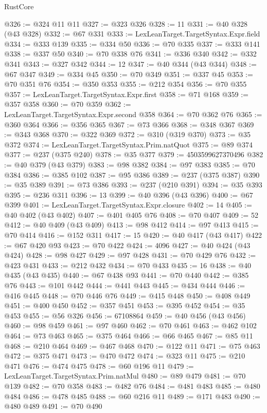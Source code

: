 \begin{lexlean}{RustCore}
\begin{coremodule}
@326 := @324 @11 @11
@327 := @323 @326
@328 := 11
@331 := @40 @328 (@43 @328)
@332 := @67 @331
@333 := LexLeanTarget.TargetSyntax.Expr.field
@334 := @333 @139
@335 := @334 @50
@336 := @70 @335
@337 := @333 @141
@338 := @337 @50
@340 := @70 @338 @76
@341 := @336 @340
@342 := @332 @341
@343 := @327 @342
@344 := 12
@347 := @40 @344 (@43 @344)
@348 := @67 @347
@349 := @334 @45
@350 := @70 @349
@351 := @337 @45
@353 := @70 @351 @76
@354 := @350 @353
@355 := @212 @354
@356 := @70 @355
@357 := LexLeanTarget.TargetSyntax.Expr.first
@358 := @71 @168
@359 := @357 @358
@360 := @70 @359
@362 := LexLeanTarget.TargetSyntax.Expr.second @358
@364 := @70 @362 @76
@365 := @360 @364
@366 := @356 @365
@367 := @73 @366
@368 := @348 @367
@369 := @343 @368
@370 := @322 @369
@372 := @310 (@319 @370)
@373 := @35 @372
@374 := LexLeanTarget.TargetSyntax.Prim.natQuot
@375 := @89 @374
@377 := @237 (@375 @240)
@378 := @35 @377
@379 := 4503599627370496
@382 := @40 @379 (@43 @379)
@383 := @98 @382
@384 := @97 @383
@385 := @70 @384
@386 := @385 @102
@387 := @95 @386
@389 := @237 (@375 @387)
@390 := @35 @389
@391 := @73 @386
@393 := @237 (@210 @391)
@394 := @35 @393
@395 := @236 @311
@396 := 13
@399 := @40 @396 (@43 @396)
@400 := @67 @399
@401 := LexLeanTarget.TargetSyntax.Expr.closure
@402 := 14
@405 := @40 @402 (@43 @402)
@407 := @401 @405 @76
@408 := @70 @407
@409 := 52
@412 := @40 @409 (@43 @409)
@413 := @98 @412
@414 := @97 @413
@415 := @70 @414
@416 := @152 @311
@417 := 15
@420 := @40 @417 (@43 @417)
@422 := @67 @420 @93
@423 := @70 @422
@424 := 4096
@427 := @40 @424 (@43 @424)
@428 := @98 @427
@429 := @97 @428
@431 := @70 @429 @76
@432 := @423 @431
@433 := @212 @432
@434 := @70 @433
@435 := 16
@438 := @40 @435 (@43 @435)
@440 := @67 @438 @93
@441 := @70 @440
@442 := @385 @76
@443 := @101 @442
@444 := @441 @443
@445 := @434 @444
@446 := @416 @445
@448 := @70 @446 @76
@449 := @415 @448
@450 := @408 @449
@451 := @400 @450
@452 := @357 @451
@453 := @395 @452
@454 := @35 @453
@455 := @56 @326
@456 := 67108864
@459 := @40 @456 (@43 @456)
@460 := @98 @459
@461 := @97 @460
@462 := @70 @461
@463 := @462 @102
@464 := @73 @463
@465 := @375 @464
@466 := @66 @465
@467 := @85 @11
@468 := @210 @464
@469 := @467 @468
@470 := @122 @11
@471 := @75 @463
@472 := @375 @471
@473 := @470 @472
@474 := @323 @11
@475 := @210 @471
@476 := @474 @475
@478 := @60 @196 @11
@479 := LexLeanTarget.TargetSyntax.Prim.natMul
@480 := @89 @479
@481 := @70 @139
@482 := @70 @358
@483 := @482 @76
@484 := @481 @483
@485 := @480 @484
@486 := @478 @485
@488 := @60 @216 @11
@489 := @171 @483
@490 := @480 @489
@491 := @70 @490

\end{coremodule}
\end{lexlean}
